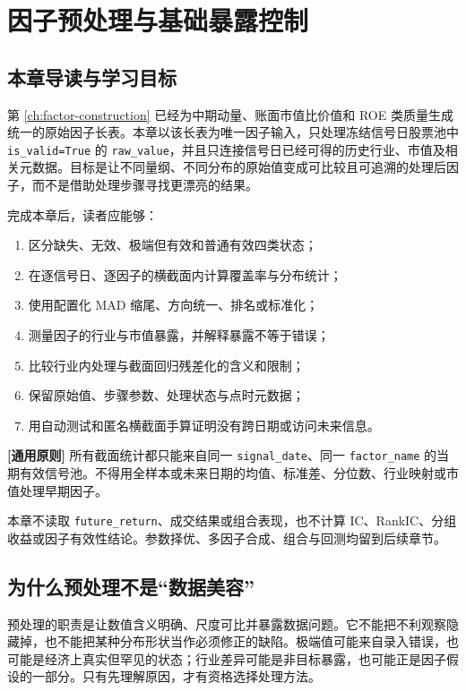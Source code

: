 \chapter{因子预处理与基础暴露控制}
\label{ch:preprocessing}

\section{本章导读与学习目标}

第 \cref{ch:factor-construction} 已经为中期动量、账面市值比价值和 ROE 类质量生成统一的原始因子长表。本章以该长表为唯一因子输入，只处理冻结信号日股票池中
\texttt{is\_valid=True} 的 \texttt{raw\_value}，并且只连接信号日已经可得的历史行业、市值及相关元数据。目标是让不同量纲、不同分布的原始值变成可比较且可追溯的处理后因子，而不是借助处理步骤寻找更漂亮的结果。

完成本章后，读者应能够：

\begin{enumerate}
  \item 区分缺失、无效、极端但有效和普通有效四类状态；
  \item 在逐信号日、逐因子的横截面内计算覆盖率与分布统计；
  \item 使用配置化 MAD 缩尾、方向统一、排名或标准化；
  \item 测量因子的行业与市值暴露，并解释暴露不等于错误；
  \item 比较行业内处理与截面回归残差化的含义和限制；
  \item 保留原始值、步骤参数、处理状态与点时元数据；
  \item 用自动测试和匿名横截面手算证明没有跨日期或访问未来信息。
\end{enumerate}

\begin{principlebox}
\textbf{[通用原则]} 所有截面统计都只能来自同一
\texttt{signal\_date}、同一 \texttt{factor\_name} 的当期有效信号池。不得用全样本或未来日期的均值、标准差、分位数、行业映射或市值处理早期因子。
\end{principlebox}

本章不读取 \texttt{future\_return}、成交结果或组合表现，也不计算 IC、RankIC、分组收益或因子有效性结论。参数择优、多因子合成、组合与回测均留到后续章节。

\section{为什么预处理不是“数据美容”}

预处理的职责是让数值含义明确、尺度可比并暴露数据问题。它不能把不利观察隐藏掉，也不能把某种分布形状当作必须修正的缺陷。极端值可能来自录入错误，也可能是经济上真实但罕见的状态；行业差异可能是非目标暴露，也可能正是因子假设的一部分。只有先理解原因，才有资格选择处理方法。

